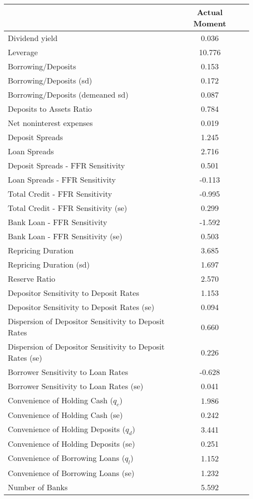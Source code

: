 \begin{tabular*}{\hsize}{@{\hskip\tabcolsep\extracolsep\fill}l*{2}{c}}\hline \hline & {Actual Moment}  &    \\ [1ex] \hline  Dividend yield&0.036&\\
Leverage&10.776&\\
Borrowing/Deposits&0.153&\\
Borrowing/Deposits (sd)&0.172&\\
Borrowing/Deposits (demeaned sd)&0.087&\\
Deposits to Assets Ratio&0.784&\\
Net noninterest expenses&0.019&\\
Deposit Spreads&1.245&\\
Loan Spreads&2.716&\\
Deposit Spreads - FFR Sensitivity&0.501&\\
Loan Spreads - FFR Sensitivity&-0.113&\\
Total Credit - FFR Sensitivity&-0.995&\\
Total Credit - FFR Sensitivity (se)&0.299&\\
Bank Loan - FFR Sensitivity&-1.592&\\
Bank Loan - FFR Sensitivity (se)&0.503&\\
Repricing Duration&3.685&\\
Repricing Duration (sd)&1.697&\\
Reserve Ratio&2.570&\\
Depositor Sensitivity to Deposit Rates&1.153&\\
Depositor Sensitivity to Deposit Rates (se)&0.094&\\
Dispersion of Depositor Sensitivity to Deposit Rates&0.660&\\
Dispersion of Depositor Sensitivity to Deposit Rates (se)&0.226&\\
Borrower Sensitivity to Loan Rates&-0.628&\\
Borrower Sensitivity to Loan Rates (se)&0.041&\\
Convenience of Holding Cash ($q_c$)&1.986&\\
Convenience of Holding Cash (se)&0.242&\\
Convenience of Holding Deposits ($q_d$)&3.441&\\
Convenience of Holding Deposits (se)&0.251&\\
Convenience of Borrowing Loans ($q_l$)&1.152&\\
Convenience of Borrowing Loans (se)&1.232&\\
Number of Banks&5.592&\\
\hline \hline \end{tabular*}
